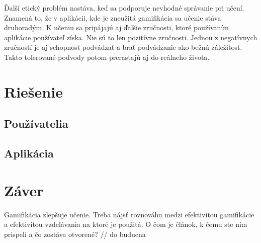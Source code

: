 \documentclass[10pt,twoside,slovak,a4paper]{article}
\begin{document}
Ďalší etický problém nastáva, keď sa podporuje nevhodné správanie pri učení. Znamená to, že v aplikácii, kde je zneužitá gamifikácia sa učenie stáva druhoradým. K učeniu sa pripájajú aj ďalšie zručnosti, ktoré používaním aplikácie používateľ získa. Nie sú to len pozitívne zručnosti. Jednou z negatívnych zručností je aj schopnosť podvádzať a brať podvádzanie ako bežnú záležitosť. Takto tolerované podvody potom prerastajú aj do reálneho života.












\section{Riešenie} \label{Riešenie}

\subsection{Používatelia} \label{Riešenie:Používatelia}

\subsection{Aplikácia} \label{Riešenie:Aplikácia}


\section{Záver} \label{zaver} %

Gamifikácia zlepšuje učenie. Treba nájsť rovnováhu medzi efektivitou gamifikácie a efektivitou vzdelávania na ktoré je použitá.
O čom je článok, k čomu ste ním prispeli a čo zostáva otvorené? // do buducna %



\end{document}
